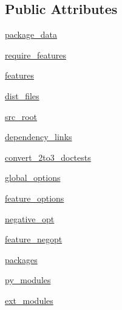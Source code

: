 \subsection*{Public Attributes}
\begin{DoxyCompactItemize}
\item 
\hyperlink{classsetuptools_1_1dist_1_1Distribution_a28ac7abd489dd4eb56729c1bd5fc4001}{package\+\_\+data}
\item 
\hyperlink{classsetuptools_1_1dist_1_1Distribution_a576913400e1384fe7e79aad89d364ea1}{require\+\_\+features}
\item 
\hyperlink{classsetuptools_1_1dist_1_1Distribution_a4aac973484f20b604157597a4737d56e}{features}
\item 
\hyperlink{classsetuptools_1_1dist_1_1Distribution_a011b87bfd00e76d08afd8b7445b638f4}{dist\+\_\+files}
\item 
\hyperlink{classsetuptools_1_1dist_1_1Distribution_a95bf259f63af6e93f852a55ec8350442}{src\+\_\+root}
\item 
\hyperlink{classsetuptools_1_1dist_1_1Distribution_a25d14204a4135fe39d72e86271931405}{dependency\+\_\+links}
\item 
\hyperlink{classsetuptools_1_1dist_1_1Distribution_a010211f65302ae1de90cbe365a87414f}{convert\+\_\+2to3\+\_\+doctests}
\item 
\hyperlink{classsetuptools_1_1dist_1_1Distribution_a7e8da0c893e1686535bd5a75e05ec6af}{global\+\_\+options}
\item 
\hyperlink{classsetuptools_1_1dist_1_1Distribution_a3b5cc4ced1f24a07b88d768bc346ecd4}{feature\+\_\+options}
\item 
\hyperlink{classsetuptools_1_1dist_1_1Distribution_a3c0f94e256dad9ef7ea6dcedb2204f65}{negative\+\_\+opt}
\item 
\hyperlink{classsetuptools_1_1dist_1_1Distribution_a0859196d2f4a80ff7ba1afe81e45fa67}{feature\+\_\+negopt}
\item 
\hyperlink{classsetuptools_1_1dist_1_1Distribution_aafc4a8c489113cdd36b9362e7c580f77}{packages}
\item 
\hyperlink{classsetuptools_1_1dist_1_1Distribution_ac9c456efcd8abfa94a30b3d72ae14da3}{py\+\_\+modules}
\item 
\hyperlink{classsetuptools_1_1dist_1_1Distribution_a69973d886a01e916148145ef6e98709f}{ext\+\_\+modules}
\end{DoxyCompactItemize}


